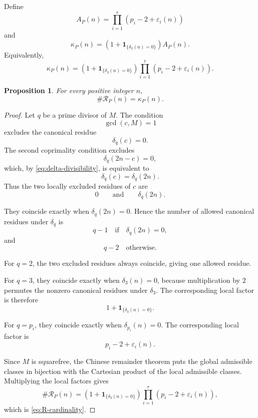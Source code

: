 \documentclass[12pt]{article}
\numberwithin{equation}{section}
\newtheorem{proposition}[theorem]{Proposition}
\theoremstyle{definition}
\theoremstyle{remark}
\newcommand{\one}[1]{\mathbf 1_{\{#1\}}}
\newcommand{\Rcal}{\mathcal R}
\begin{document}
Define
\begin{equation}
\label{eq:A-definition}
A_P(n)
=
\prod_{i=1}^{r}
\left(p_i-2+\varepsilon_i(n)\right)
\end{equation}
and
\begin{equation}
\label{eq:kappa-definition}
\kappa_P(n)
=
\left(1+\one{\delta_3(n)=0}\right)A_P(n).
\end{equation}
Equivalently,
\[
\kappa_P(n)
=
\left(1+\one{\delta_3(n)=0}\right)
\prod_{i=1}^{r}
\left(p_i-2+\varepsilon_i(n)\right).
\]

\begin{proposition}
\label{prop:R-cardinality}
For every positive integer $n$,
\begin{equation}
\label{eq:R-cardinality}
\#\Rcal_P(n)=\kappa_P(n).
\end{equation}
\end{proposition}

\begin{proof}
Let $q$ be a prime divisor of $M$. The condition
\[
\gcd(c,M)=1
\]
excludes the canonical residue
\[
\delta_q(c)=0.
\]
The second coprimality condition excludes
\[
\delta_q(2n-c)=0,
\]
which, by \eqref{eq:delta-divisibility}, is equivalent to
\[
\delta_q(c)=\delta_q(2n).
\]
Thus the two locally excluded residues of $c$ are
\[
0
\qquad\text{and}\qquad
\delta_q(2n).
\]

They coincide exactly when $\delta_q(2n)=0$. Hence the number of
allowed canonical residues under $\delta_q$ is
\[
q-1
\quad\text{if}\quad
\delta_q(2n)=0,
\]
and
\[
q-2
\quad\text{otherwise}.
\]

For $q=2$, the two excluded residues always coincide, giving
one allowed residue.

For $q=3$, they coincide exactly when $\delta_3(n)=0$, because
multiplication by $2$ permutes the nonzero canonical residues
under $\delta_3$. The corresponding local factor is therefore
\[
1+\one{\delta_3(n)=0}.
\]

For $q=p_i$, they coincide exactly when
$\delta_{p_i}(n)=0$. The corresponding local factor is
\[
p_i-2+\varepsilon_i(n).
\]

Since $M$ is squarefree, the Chinese remainder theorem puts the
global admissible classes in bijection with the Cartesian product
of the local admissible classes. Multiplying the local factors gives
\[
\#\Rcal_P(n)
=
\left(1+\one{\delta_3(n)=0}\right)
\prod_{i=1}^{r}
\left(p_i-2+\varepsilon_i(n)\right),
\]
which is \eqref{eq:R-cardinality}.
\end{proof}
\end{document}
